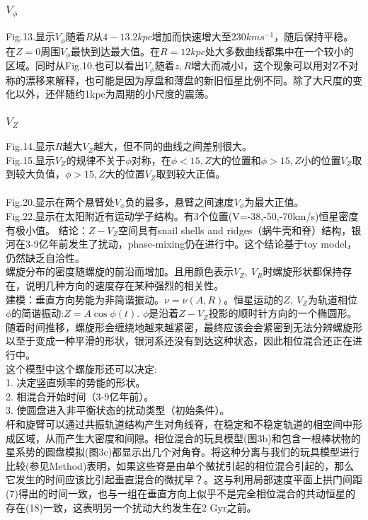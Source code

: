 \documentclass[UTF8,9pt]{ctexart}
\begin{document}
\subsubsection*{$V_\phi$}
Fig.13.显示$V_\phi$随着$R$从$4-13.2kpc$增加而快速增大至$230kms^{-1}$，随后保持平稳。在$Z=0周围$$V_\phi$最快到达最大值。在$R=12kpc$处大多数曲线都集中在一个较小的区域。同时从Fig.10.也可以看出$V_\phi$随着$z,R$增大而减小l，这个现象可以用对Z不对称的漂移来解释，也可能是因为厚盘和薄盘的新旧恒星比例不同。除了大尺度的变化以外，还伴随约1kpc为周期的小尺度的震荡。\\
\subsubsection*{$V_Z$}
Fig.14.显示$R$越大$V_Z$越大，但不同的曲线之间差别很大。\\
Fig.15.显示$V_Z$的规律不关于$\phi$对称，在$\phi<15, Z$大的位置和$\phi>15, Z$小的位置$V_Z$取到较大负值，$\phi>15, Z$大的位置$V_Z$取到较大正值。\\
\\
Fig.20.显示在两个悬臂处$V_\phi$负的最多，悬臂之间速度$V_\phi$为最大正值。\\
Fig.22.显示在太阳附近有运动学子结构。有3个位置(V=-38,-50,-70km/s)恒星密度有极小值。
结论：$Z-V_Z$空间具有snail shells and ridges（蜗牛壳和脊）结构，银河在3-9亿年前发生了扰动，phase-mixing仍在进行中。这个结论基于toy model，仍然缺乏自洽性。\\
螺旋分布的密度随螺旋的前沿而增加。且用颜色表示$V_Z,\ V_R$时螺旋形状都保持存在，说明几种方向的速度存在某种强烈的相关性。\\
建模：垂直方向势能为非简谐振动。$\nu=\nu(A,R)$。恒星运动的$Z,\ V_Z$为轨道相位$\phi$的简谐振动:$Z=A\cos\phi(t)$. $\phi$是沿着$Z-V_Z$投影的顺时针方向的一个椭圆形。\\
随着时间推移，螺旋形会缠绕地越来越紧密，最终应该会会紧密到无法分辨螺旋形以至于变成一种平滑的形状，银河系还没有到达这种状态，因此相位混合还正在进行中。\\
这个模型中这个螺旋形还可以决定:\\
    1. 决定竖直频率的势能的形状。\\
    2. 相混合开始时间（3-9亿年前）。\\
    3. 使圆盘进入非平衡状态的扰动类型（初始条件）。\\
杆和旋臂可以通过共振轨道结构产生对角线脊，在稳定和不稳定轨道的相空间中形成区域，从而产生大密度和间隙。相位混合的玩具模型(图3b)和包含一根棒状物的星系势的圆盘模拟(图3c)都显示出几个对角脊。将这种分离与我们的玩具模型进行比较(参见Method)表明，如果这些脊是由单个微扰引起的相位混合引起的，那么它发生的时间应该比引起垂直混合的微扰早？。这与利用局部速度平面上拱门间距(7)得出的时间一致，也与一组在垂直方向上似乎不是完全相位混合的共动恒星的存在(18)一致，这表明另一个扰动大约发生在2 Gyr之前。
\end{document}

